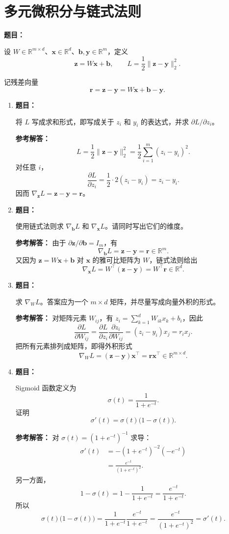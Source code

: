 \documentclass[11pt,a4paper]{article}
\newcommand{\R}{\mathbb{R}}
\newcommand{\grad}{\nabla}
\newcommand{\ans}{\textcolor{answerblue}{\textbf{参考解答：}}}
\newenvironment{question}{%
  \par\begingroup\color{black!82}\noindent\textbf{题目：}\ignorespaces
}{%
  \par\endgroup\smallskip
}
\begin{document}
\section{多元微积分与链式法则}

\begin{question}
设 $W\in\R^{m\times d}$、$\bm x\in\R^d$、$\bm b,\bm y\in\R^m$，定义
\[
  \bm z=W\bm x+\bm b,
  \qquad
  L=\frac{1}{2}\lVert\bm z-\bm y\rVert_2^2.
\]
\end{question}

记残差向量
\[
  \bm r=\bm z-\bm y=W\bm x+\bm b-\bm y.
\]

\begin{enumerate}
  \item
  \begin{question}
  将 $L$ 写成求和形式，即写成关于 $z_i$ 和 $y_i$ 的表达式，并求
  $\partial L/\partial z_i$。
  \end{question}
  \ans
  \[
    L=\frac12\lVert\bm z-\bm y\rVert_2^2
     =\frac12\sum_{i=1}^{m}(z_i-y_i)^2.
  \]
  对任意 $i$，
  \[
    \frac{\partial L}{\partial z_i}
    =\frac12\cdot2(z_i-y_i)=z_i-y_i.
  \]
  因而 $\grad_{\bm z}L=\bm z-\bm y=\bm r$。

  \item
  \begin{question}
  使用链式法则求 $\grad_{\bm b}L$ 和 $\grad_{\bm x}L$。请同时写出它们的维度。
  \end{question}
  \ans
  由于 $\partial\bm z/\partial\bm b=I_m$，有
  \[
    \boxed{\grad_{\bm b}L=\bm z-\bm y=\bm r\in\R^m}.
  \]
  又因为 $\bm z=W\bm x+\bm b$ 对 $\bm x$ 的雅可比矩阵为 $W$，链式法则给出
  \[
    \boxed{\grad_{\bm x}L=W^\top(\bm z-\bm y)=W^\top\bm r\in\R^d}.
  \]

  \item
  \begin{question}
  求 $\grad_W L$。答案应为一个 $m\times d$ 矩阵，并尽量写成向量外积的形式。
  \end{question}
  \ans
  对矩阵元素 $W_{ij}$，有 $z_i=\sum_{k=1}^{d}W_{ik}x_k+b_i$，因此
  \[
    \frac{\partial L}{\partial W_{ij}}
    =\frac{\partial L}{\partial z_i}\frac{\partial z_i}{\partial W_{ij}}
    =(z_i-y_i)x_j=r_i x_j.
  \]
  把所有元素排列成矩阵，即得外积形式
  \[
    \boxed{\grad_W L=(\bm z-\bm y)\bm x^\top=\bm r\bm x^\top
    \in\R^{m\times d}}.
  \]

  \item
  \begin{question}
  Sigmoid 函数定义为
  \[
    \sigma(t)=\frac{1}{1+e^{-t}}.
  \]
  证明
  \[
    \sigma'(t)=\sigma(t)\bigl(1-\sigma(t)\bigr).
  \]

  \end{question}
  \ans
  对 $\sigma(t)=(1+e^{-t})^{-1}$ 求导：
  \begin{align*}
    \sigma'(t)
    &=-(1+e^{-t})^{-2}(-e^{-t})\\
    &=\frac{e^{-t}}{(1+e^{-t})^2}.
  \end{align*}
  另一方面，
  \[
    1-\sigma(t)
    =1-\frac{1}{1+e^{-t}}
    =\frac{e^{-t}}{1+e^{-t}}.
  \]
  所以
  \[
    \sigma(t)\bigl(1-\sigma(t)\bigr)
    =\frac{1}{1+e^{-t}}\frac{e^{-t}}{1+e^{-t}}
    =\frac{e^{-t}}{(1+e^{-t})^2}
    =\sigma'(t).
  \]
\end{enumerate}
\end{document}
